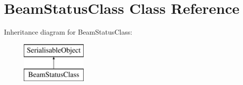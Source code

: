 \hypertarget{classBeamStatusClass}{\section{Beam\-Status\-Class Class Reference}
\label{classBeamStatusClass}
}
Inheritance diagram for Beam\-Status\-Class\-:\begin{figure}[H]
\begin{center}
\leavevmode
\includegraphics[height=2.000000cm]{classBeamStatusClass}
\end{center}
\end{figure}
